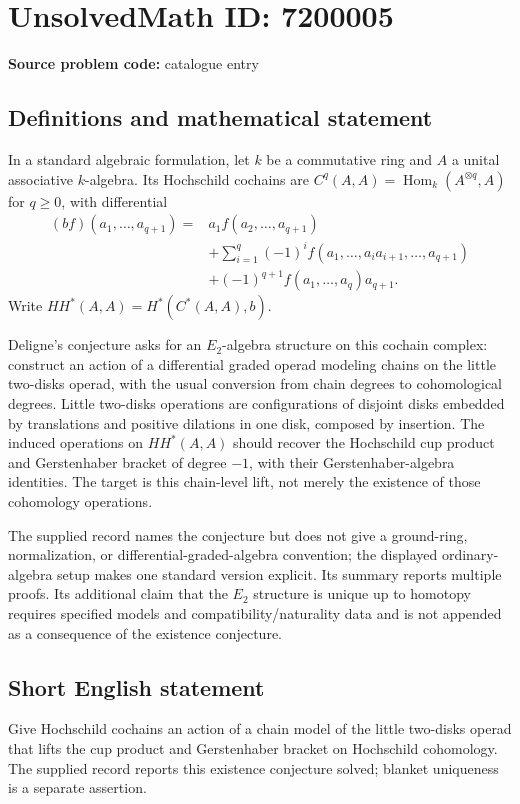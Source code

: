\documentclass[11pt]{article}
\begin{document}
\section*{UnsolvedMath ID: 7200005}
\textbf{Source problem code:} catalogue entry
\subsection{Definitions and mathematical statement}
In a standard algebraic formulation, let $k$ be a commutative ring and $A$ a unital associative $k$-algebra. Its Hochschild cochains are $C^q(A,A)=\operatorname{Hom}_k(A^{\otimes q},A)$ for $q\geq0$, with differential
\[
\begin{aligned}
(bf)(a_1,\ldots,a_{q+1})={}&a_1f(a_2,\ldots,a_{q+1})\\
&+\sum_{i=1}^{q}(-1)^i f(a_1,\ldots,a_i a_{i+1},\ldots,a_{q+1})\\
&+(-1)^{q+1}f(a_1,\ldots,a_q)a_{q+1}.
\end{aligned}
\]
Write $HH^*(A,A)=H^*(C^*(A,A),b)$.

Deligne's conjecture asks for an $E_2$-algebra structure on this cochain complex: construct an action of a differential graded operad modeling chains on the little two-disks operad, with the usual conversion from chain degrees to cohomological degrees. Little two-disks operations are configurations of disjoint disks embedded by translations and positive dilations in one disk, composed by insertion. The induced operations on $HH^*(A,A)$ should recover the Hochschild cup product and Gerstenhaber bracket of degree $-1$, with their Gerstenhaber-algebra identities. The target is this chain-level lift, not merely the existence of those cohomology operations.

The supplied record names the conjecture but does not give a ground-ring, normalization, or differential-graded-algebra convention; the displayed ordinary-algebra setup makes one standard version explicit. Its summary reports multiple proofs. Its additional claim that the $E_2$ structure is unique up to homotopy requires specified models and compatibility/naturality data and is not appended as a consequence of the existence conjecture.
\subsection{Short English statement}
Give Hochschild cochains an action of a chain model of the little two-disks operad that lifts the cup product and Gerstenhaber bracket on Hochschild cohomology. The supplied record reports this existence conjecture solved; blanket uniqueness is a separate assertion.
\end{document}
